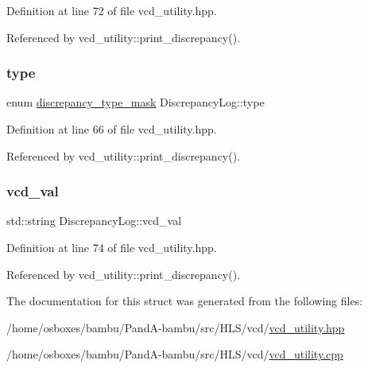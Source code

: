 Definition at line 72 of file vcd\+\_\+utility.\+hpp.



Referenced by vcd\+\_\+utility\+::print\+\_\+discrepancy().

\mbox{\label{structDiscrepancyLog_ada7ae5b0629194aa4c665d7d2212a606}} 
\subsubsection{\texorpdfstring{type}{type}}
{\footnotesize\ttfamily enum \hyperlink{DiscrepancyOpInfo_8hpp_ae95cd44b11919bdb0ddc5eb2dbe46e09}{discrepancy\+\_\+type\+\_\+mask} Discrepancy\+Log\+::type}



Definition at line 66 of file vcd\+\_\+utility.\+hpp.



Referenced by vcd\+\_\+utility\+::print\+\_\+discrepancy().

\mbox{\label{structDiscrepancyLog_ad54b5f61d46983e9b273ed976f00de09}} 
\subsubsection{\texorpdfstring{vcd\+\_\+val}{vcd\_val}}
{\footnotesize\ttfamily std\+::string Discrepancy\+Log\+::vcd\+\_\+val}



Definition at line 74 of file vcd\+\_\+utility.\+hpp.



Referenced by vcd\+\_\+utility\+::print\+\_\+discrepancy().



The documentation for this struct was generated from the following files\+:\begin{DoxyCompactItemize}
\item 
/home/osboxes/bambu/\+Pand\+A-\/bambu/src/\+H\+L\+S/vcd/\hyperlink{vcd__utility_8hpp}{vcd\+\_\+utility.\+hpp}\item 
/home/osboxes/bambu/\+Pand\+A-\/bambu/src/\+H\+L\+S/vcd/\hyperlink{vcd__utility_8cpp}{vcd\+\_\+utility.\+cpp}\end{DoxyCompactItemize}
